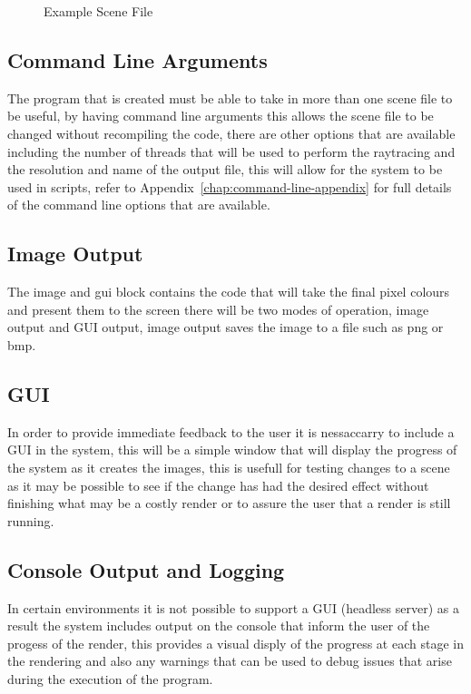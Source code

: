 \begin{figure}

\label{fig:scene_file_example}
\caption{Example Scene File}
\end{figure}

\subsection{Command Line Arguments}
The program that is created must be able to take in more than one scene file to be useful, by having command
line arguments this allows the scene file to be changed without recompiling the code, there are other options
that are available including the number of threads that will be used to perform the raytracing and the
resolution and name of the output file, this will allow for the system to be used in scripts, refer to
Appendix~\ref{chap:command-line-appendix} for full details of the command line options that are available.

\subsection{Image Output}
The image and gui block contains the code that will take the final pixel colours and present them to the screen
there will be two modes of operation, image output and GUI output, image output saves the image to a file such
as png or bmp.

\subsection{GUI}
In order to provide immediate feedback to the user it is nessaccarry to include a GUI in the system, this will
be a simple window that will display the progress of the system as it creates the images, this is usefull
for testing changes to a scene as it may be possible to see if the change has had the desired effect without
finishing what may be a costly render or to assure the user that a render is still running.


\subsection{Console Output and Logging}
In certain environments it is not possible to support a GUI (headless server) as a result the system includes
output on the console that inform the user of the progess of the render, this provides a visual disply of the
progress at each stage in the rendering and also any warnings that can be used to debug issues that arise
during the execution of the program.
